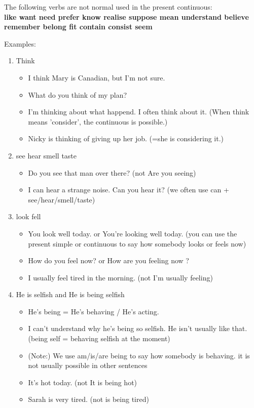 \documentclass[12pt]{article}
\begin{document}
    The following verbs are not normal used in the present continuous: \\
    \textbf{like \quad want \quad need \quad prefer \quad know \quad realise \quad suppose \quad mean \quad understand \quad believe
    \quad remember \quad belong \quad fit \quad contain \quad consist \quad seem}

    Examples:
    \begin{enumerate}
        \item Think
        \begin{itemize}
            \item I think Mary is Canadian, but I'm not sure.
            \item What do you think of my plan?
            \item I'm thinking about what happend. I often think about it. (When think means 'consider', the continuous is possible.)
            \item Nicky is thinking of giving up her job. (=she is considering it.)
        \end{itemize}
        
        \item see hear smell taste
        \begin{itemize}
            \item Do you see that man over there? (not Are you seeing)
            \item I can hear a strange noise. Can you hear it? (we often use can + see/hear/smell/taste)
        \end{itemize}
        \item look fell
        \begin{itemize}
            \item You look well today. or You're looking well today. (you can use the present simple or continuous to say how somebody
            looks or feels now)
            \item How do you feel now? or How are you feeling now ?
            \item  I usually feel tired in the morning. (not I'm usually feeling)
        \end{itemize}

        \item He is selfish and He is being selfish
        \begin{itemize}
            \item He's being = He's behaving / He's acting.
            \item I can't understand why he's being so selfish. He isn't usually like that. (being self = behaving selfish at the moment)

            \item (Note:) We use am/is/are being to say how somebody is behaving. it is not usually possible in other sentences
            \item It's hot today. (not It is being hot)
            \item Sarah is very tired. (not is being tired)
        \end{itemize}
    \end{enumerate}
    
\end{document}

